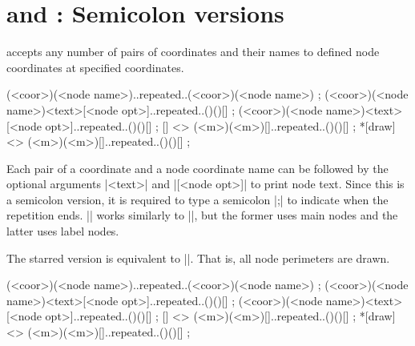 \begin{tzcode}{.3}
\end{tzcode}


\section{\protect\cmd{\tznodes} and \protect\cmd{\tznodes*}: Semicolon versions}
\label{s:tznodes}

\icmd{\tznodes} accepts any number of  pairs of coordinates and their names to defined node coordinates at specified coordinates.

\begin{tzdef}
\tznodes(<coor>)(<node name>)..repeated..(<coor>)(<node name>) ;
\tznodes(<coor>)(<node name>){<text>}[<node opt>]..repeated..()(){}[] ;
        (<coor>)(<node name>){<text>}[<node opt>]..repeated..()(){}[] ;
  []    <> (<m>)(<m>){}[]..repeated..()(){}[] ; 
 *[draw]<> (<m>)(<m>){}[]..repeated..()(){}[] ; 
\end{tzdef}

Each pair of a coordinate and a node coordinate name can be followed by the optional arguments |{<text>}| and |[<node opt>]| to print node text.
Since this is a semicolon version, it is required to type a semicolon |;| to indicate when the repetition ends.
|\tznodes| works similarly to |\tzcoors|, but the former uses main nodes and the latter uses label nodes.

The starred version \icmd{\tznodes*} is equivalent to |\tznodes[draw]|. That is, all node perimeters are drawn.

\begin{tzcode}{.3}
{}
\end{tzcode}


\begin{tzdef}
\tznodes(<coor>)(<node name>)..repeated..(<coor>)(<node name>) ;
\tznodes(<coor>)(<node name>){<text>}[<node opt>]..repeated..()(){}[] ;
        (<coor>)(<node name>){<text>}[<node opt>]..repeated..()(){}[] ;
  []    <> (<m>)(<m>){}[]..repeated..()(){}[] ; 
 *[draw]<> (<m>)(<m>){}[]..repeated..()(){}[] ; 
\end{tzdef}



